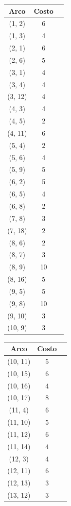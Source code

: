 \begin{table}[h!]
\centering
\begin{tabular}{ccc}
  \toprule
    Arco & Costo \\
  \midrule
    (1, 2) & 6 \\
    (1, 3) & 4 \\
    (2, 1) & 6 \\
    (2, 6) & 5 \\
    (3, 1) & 4 \\
    (3, 4) & 4 \\
    (3, 12) & 4 \\
    (4, 3) & 4 \\
    (4, 5) & 2 \\
    (4, 11) & 6 \\
    (5, 4) & 2 \\
    (5, 6) & 4 \\
    (5, 9) & 5 \\
    (6, 2) & 5 \\
    (6, 5) & 4 \\
    (6, 8) & 2 \\
    (7, 8) & 3 \\
    (7, 18) & 2 \\
    (8, 6) & 2 \\
    (8, 7) & 3 \\
    (8, 9) & 10 \\
    (8, 16) & 5 \\
    (9, 5) & 5 \\
    (9, 8) & 10 \\
    (9, 10) & 3 \\
    (10, 9) & 3 \\
  \bottomrule
\end{tabular}
\begin{tabular}{ccc}
  \toprule
    Arco & Costo \\
  \midrule
    (10, 11) & 5 \\
    (10, 15) & 6 \\
    (10, 16) & 4 \\
    (10, 17) & 8 \\
    (11, 4) & 6 \\
    (11, 10) & 5 \\
    (11, 12) & 6 \\
    (11, 14) & 4 \\
    (12, 3) & 4 \\
    (12, 11) & 6 \\
    (12, 13) & 3 \\
    (13, 12) & 3 \\

\end{tabular}
\end{table}
